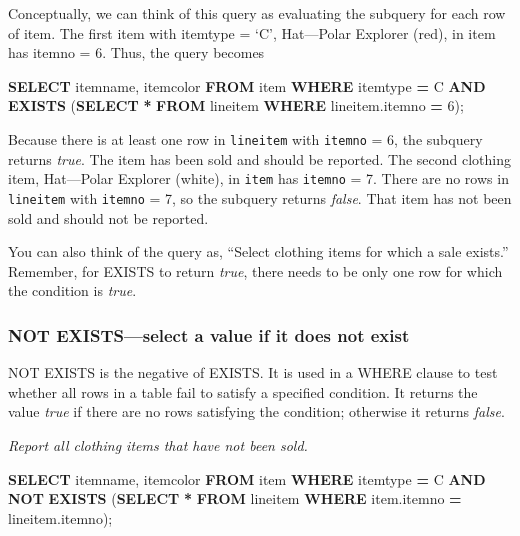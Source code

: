 \documentclass[
]{article}
\newenvironment{Shaded}{\begin{snugshade}}{\end{snugshade}}
\newcommand{\DecValTok}[1]{\textcolor[rgb]{0.00,0.00,0.81}{#1}}
\newcommand{\KeywordTok}[1]{\textcolor[rgb]{0.13,0.29,0.53}{\textbf{#1}}}
\newcommand{\NormalTok}[1]{#1}
\newcommand{\OperatorTok}[1]{\textcolor[rgb]{0.81,0.36,0.00}{\textbf{#1}}}
\newcommand{\StringTok}[1]{\textcolor[rgb]{0.31,0.60,0.02}{#1}}
\begin{document}
Conceptually, we can think of this query as evaluating the subquery for each row of item. The first item with itemtype = `C', Hat---Polar Explorer (red), in item has itemno = 6. Thus, the query becomes

\begin{Shaded}
\begin{Highlighting}[]
\KeywordTok{SELECT}\NormalTok{ itemname, itemcolor }\KeywordTok{FROM}\NormalTok{ item}
    \KeywordTok{WHERE}\NormalTok{ itemtype }\OperatorTok{=} \StringTok{\textquotesingle{}C\textquotesingle{}}
    \KeywordTok{AND} \KeywordTok{EXISTS}\NormalTok{ (}\KeywordTok{SELECT} \OperatorTok{*} \KeywordTok{FROM}\NormalTok{ lineitem}
        \KeywordTok{WHERE}\NormalTok{ lineitem.itemno }\OperatorTok{=} \DecValTok{6}\NormalTok{);}
\end{Highlighting}
\end{Shaded}

Because there is at least one row in \texttt{lineitem} with \texttt{itemno} = 6, the subquery returns \emph{true}. The item has been sold and should be reported. The second clothing item, Hat---Polar Explorer (white), in \texttt{item} has \texttt{itemno} = 7. There are no rows in \texttt{lineitem} with \texttt{itemno} = 7, so the subquery returns \emph{false}. That item has not been sold and should not be reported.

You can also think of the query as, ``Select clothing items for which a sale exists.'' Remember, for EXISTS to return \emph{true}, there needs to be only one row for which the condition is \emph{true}.

\hypertarget{not-existsselect-a-value-if-it-does-not-exist}{%
\subsubsection*{NOT EXISTS---select a value if it does not exist}\label{not-existsselect-a-value-if-it-does-not-exist}}

NOT EXISTS is the negative of EXISTS. It is used in a WHERE clause to test whether all rows in a table fail to satisfy a specified condition. It returns the value \emph{true} if there are no rows satisfying the condition; otherwise it returns \emph{false}.

\emph{Report all clothing items that have not been sold.}

\begin{Shaded}
\begin{Highlighting}[]
\KeywordTok{SELECT}\NormalTok{ itemname, itemcolor }\KeywordTok{FROM}\NormalTok{ item}
    \KeywordTok{WHERE}\NormalTok{ itemtype }\OperatorTok{=} \StringTok{\textquotesingle{}C\textquotesingle{}}
    \KeywordTok{AND} \KeywordTok{NOT} \KeywordTok{EXISTS}
\NormalTok{        (}\KeywordTok{SELECT} \OperatorTok{*} \KeywordTok{FROM}\NormalTok{ lineitem}
            \KeywordTok{WHERE}\NormalTok{ item.itemno }\OperatorTok{=}\NormalTok{ lineitem.itemno);}
\end{Highlighting}
\end{Shaded}
\end{document}
